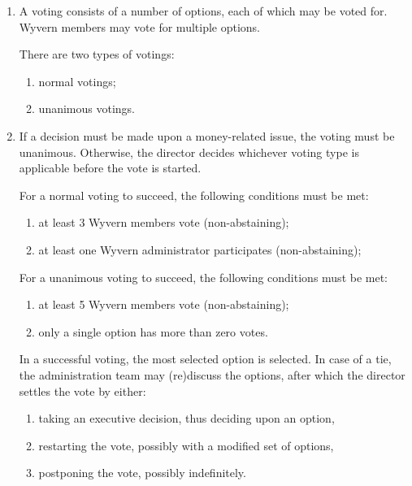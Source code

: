 \documentclass[a4paper]{article}
\begin{document}
\begin{appendices}
\begin{enumerate}
    \item A voting consists of a number of options, each of which may be voted for. Wyvern members may vote for multiple options.

    \begin{item}
        There are two types of votings:
        \begin{enumerate}
            \item normal votings;
            \item unanimous votings.
        \end{enumerate}
    \end{item}

    \item If a decision must be made upon a money-related issue, the voting must be unanimous. Otherwise, the director decides whichever voting type is applicable before the vote is started.

    \begin{item}
        For a normal voting to succeed, the following conditions must be met:
        \begin{enumerate}
            \item at least 3 Wyvern members vote (non-abstaining);
            \item at least one Wyvern administrator participates (non-abstaining);
        \end{enumerate}
    \end{item}

    \begin{item}
        For a unanimous voting to succeed, the following conditions must be met:
        \begin{enumerate}
            \item at least 5 Wyvern members vote (non-abstaining);
            \item only a single option has more than zero votes.
        \end{enumerate}
    \end{item}

    \begin{item}
        In a successful voting, the most selected option is selected. In case of a tie, the administration team may (re)discuss the options, after which the director settles the vote by either:
        \begin{enumerate}
            \item taking an executive decision, thus deciding upon an option,
            \item restarting the vote, possibly with a modified set of options,
            \item postponing the vote, possibly indefinitely.
        \end{enumerate}
    \end{item}
    

\end{enumerate}
\end{appendices}
\end{document}
